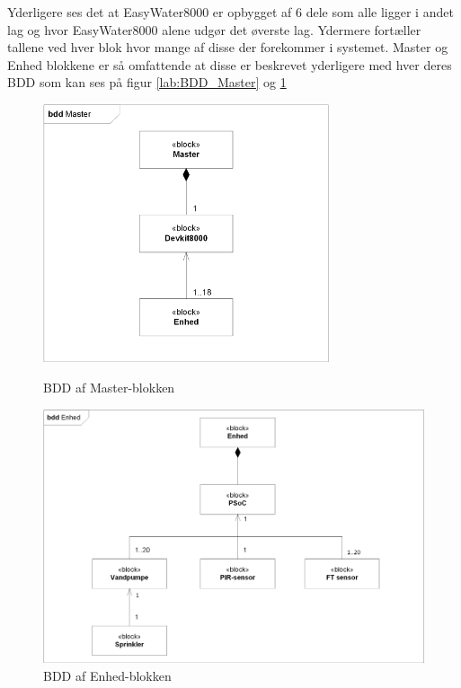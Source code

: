 Yderligere ses det at EasyWater8000 er opbygget af 6 dele som alle ligger i andet lag og hvor EasyWater8000 alene udgør det øverste lag. Ydermere fortæller tallene ved hver blok hvor mange af disse der forekommer i systemet. 
Master og Enhed blokkene er så omfattende at disse er beskrevet yderligere med hver deres BDD som kan ses på figur \ref{lab:BDD_Master} og \ref{lab:BDD_Enhed} 

\begin{figure}[H]
\begin{minipage}{0.45\textwidth}
  \centering
    \includegraphics[width=0.75\textwidth]{Billeder/BDD_Master}
    \caption{BDD af Master-blokken}
    \label{lab:BDD_Master}
\end{minipage}
\hspace{0.1\textwidth}
\begin{minipage}{0.45\textwidth}
  \centering
    \includegraphics[width=1\textwidth]{Billeder/BDD_Enhed}
    \caption{BDD af Enhed-blokken}
    \label{lab:BDD_Enhed}
    \end{minipage}
\end{figure}


